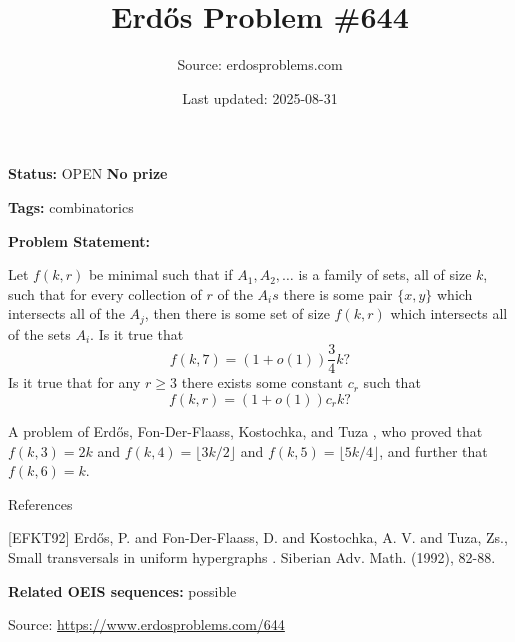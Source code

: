 \documentclass{article}
\title{Erd\H{o}s Problem \#644}
\date{Last updated: 2025-08-31}
\author{Source: erdosproblems.com}
\begin{document}
\maketitle

\noindent\textbf{Status:} OPEN \quad \textbf{No prize}

\noindent\textbf{Tags:} combinatorics

\medskip

\noindent\textbf{Problem Statement:}

Let $f(k,r)$ be minimal such that if $A_1,A_2,\ldots$ is a family of sets, all of size $k$, such that for every collection of $r$ of the $A_is$ there is some pair $\{x,y\}$ which intersects all of the $A_j$, then there is some set of size $f(k,r)$ which intersects all of the sets $A_i$. Is it true that\[f(k,7)=(1+o(1))\frac{3}{4}k?\]Is it true that for any $r\geq 3$ there exists some constant $c_r$ such that\[f(k,r)=(1+o(1))c_rk?\]




A problem of Erd\H{o}s, Fon-Der-Flaass, Kostochka, and Tuza \cite{EFKT92}, who proved that $f(k,3)=2k$ and $f(k,4)=\lfloor 3k/2\rfloor$ and $f(k,5)=\lfloor 5k/4\rfloor$, and further that $f(k,6)=k$.




References

[EFKT92] Erd\H{o}s, P. and Fon-Der-Flaass, D. and Kostochka, A. V. and Tuza, Zs., Small transversals in uniform hypergraphs . Siberian Adv. Math. (1992), 82-88.

\noindent\textbf{Related OEIS sequences:} possible


\bigskip
\noindent\small{Source: \url{https://www.erdosproblems.com/644}}
\end{document}
